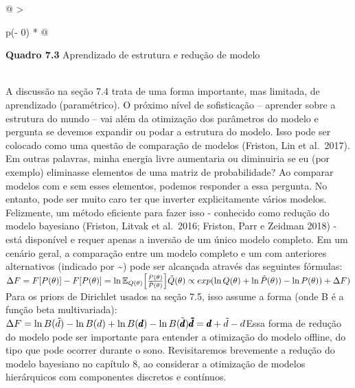 \documentclass[
  12pt,
]{book}
\begin{document}
\begin{longtable}[]{@{}
  >{\raggedright\arraybackslash}p{(\columnwidth - 0\tabcolsep) * }@{}}
\toprule
\begin{minipage}[b]{\linewidth}\raggedright
\textbf{Quadro 7.3} Aprendizado de estrutura e redução de modelo
\end{minipage} \\
\midrule
\endhead
A discussão na seção 7.4 trata de uma forma importante, mas limitada, de aprendizado (paramétrico). O próximo nível de sofisticação -- aprender sobre a estrutura do mundo -- vai além da otimização dos parâmetros do modelo e pergunta se devemos expandir ou podar a estrutura do modelo. Isso pode ser colocado como uma questão de comparação de modelos (Friston, Lin et al.~2017). Em outras palavras, minha energia livre aumentaria ou diminuiria se eu (por exemplo) eliminasse elementos de uma matriz de probabilidade? Ao comparar modelos com e sem esses elementos, podemos responder a essa pergunta. No entanto, pode ser muito caro ter que inverter explicitamente vários modelos. Felizmente, um método eficiente para fazer isso - conhecido como redução do modelo bayesiano (Friston, Litvak et al.~2016; Friston, Parr e Zeidman 2018) - está disponível e requer apenas a inversão de um único modelo completo. Em um cenário geral, a comparação entre um modelo completo e um com anteriores alternativos (indicado por \textasciitilde) pode ser alcançada através das seguintes fórmulas:\(\begin{equation} \Delta F = F[P(\theta)]-F[P(\theta)]=\ln \mathbb E_{Q(\theta)}\Big [\frac{P(\theta)}{\tilde P(\theta)}\Big] \\ \tilde Q(\theta) \propto exp(\ln Q(\theta)+\ln \tilde P(\theta)) - \ln P(\theta)) +\Delta F) \end{equation}\)Para os priors de Dirichlet usados na seção 7.5, isso assume a forma (onde B é a função beta multivariada):\(\begin{equation} \Delta F = \ln B(\tilde d)- \ln B(d) + \ln B(\pmb d)-\ln B(\tilde {\pmb d}) \\ \pmb {\tilde d}=\pmb d+\tilde d-d \end{equation}\)Essa forma de redução do modelo pode ser importante para entender a otimização do modelo offline, do tipo que pode ocorrer durante o sono. Revisitaremos brevemente a redução do modelo bayesiano no capítulo 8, ao considerar a otimização de modelos hierárquicos com componentes discretos e contínuos. \\
\bottomrule
\end{longtable}
\end{document}
